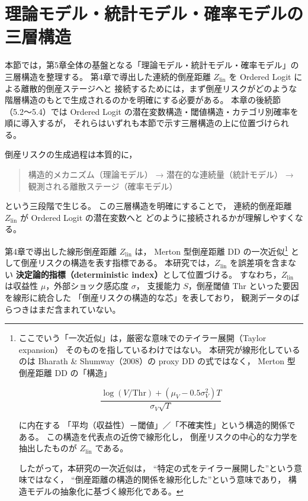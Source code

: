 
\section{理論モデル・統計モデル・確率モデルの三層構造}
\label{sec:three_layer_structure}

本節では，第5章全体の基盤となる「理論モデル・統計モデル・確率モデル」の三層構造を整理する。
第4章で導出した連続的倒産距離 $Z_{\text{lin}}$ を Ordered Logit による離散的倒産ステージへと
接続するためには，まず倒産リスクがどのような階層構造のもとで生成されるのかを明確にする必要がある。
本章の後続節（5.2〜5.4）では Ordered Logit の潜在変数構造・閾値構造・カテゴリ別確率を順に導入するが，
それらはいずれも本節で示す三層構造の上に位置づけられる。

倒産リスクの生成過程は本質的に，

\begin{quote}
構造的メカニズム（理論モデル）  
→ 潜在的な連続量（統計モデル）  
→ 観測される離散ステージ（確率モデル）
\end{quote}

という三段階で生じる。
この三層構造を明確にすることで，
連続的倒産距離 $Z_{\text{lin}}$ が Ordered Logit の潜在変数へと
どのように接続されるかが理解しやすくなる。

第4章で導出した線形倒産距離 $Z_{\text{lin}}$ は，
Merton 型倒産距離 DD の一次近似\footnote{
ここでいう「一次近似」は，厳密な意味でのテイラー展開（Taylor expansion）
そのものを指しているわけではない。
本研究が線形化しているのは Bharath \& Shumway（2008）の proxy DD の式ではなく，
Merton 型倒産距離 DD の「構造」


\[
\frac{\log(V/\mathrm{Thr}) + (\mu_V - 0.5\sigma_V^2)T}{\sigma_V\sqrt{T}}
\]


に内在する
「平均（収益性）－閾値」／「不確実性」という構造的関係である。
この構造を代表点の近傍で線形化し，
倒産リスクの中心的な力学を抽出したものが $Z_{\text{lin}}$ である。

したがって，本研究の一次近似は，
“特定の式をテイラー展開した”という意味ではなく，
“倒産距離の構造的関係を線形化した”という意味であり，
構造モデルの抽象化に基づく線形化である。
}
として倒産リスクの構造を表す指標である。
本研究では，$Z_{\text{lin}}$ を誤差項を含まない
\textbf{決定論的指標（deterministic index）}として位置づける。
すなわち，$Z_{\text{lin}}$ は収益性 $\mu$，外部ショック感応度 $\sigma$，
支援能力 $S$，倒産閾値 $\mathrm{Thr}$ といった要因を線形に統合した
「倒産リスクの構造的な芯」を表しており，
観測データのばらつきはまだ含まれていない。

